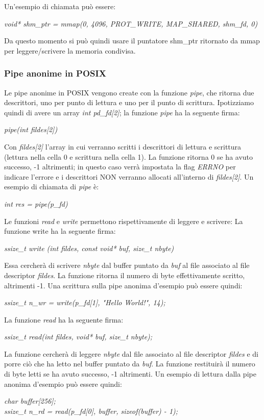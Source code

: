 \documentclass[12pt]{article}
\begin{document}
Un'esempio di chiamata può essere:
\begin{center}
    \textit{void* shm\_ptr = mmap(0, 4096, PROT\_WRITE, MAP\_SHARED, shm\_fd, 0)}
\end{center}
Da questo momento si può quindi usare il puntatore shm\_ptr ritornato da mmap per leggere/scrivere la memoria condivisa.
\subsubsection{Pipe anonime in POSIX}
Le pipe anonime in POSIX vengono create con la funzione \textit{pipe}, che ritorna due descrittori, uno per punto di lettura e uno per il punto di scrittura.
Ipotizziamo quindi di avere un array \textit{int pd\_fd[2]}; la funzione \textit{pipe} ha la seguente firma:
\begin{center}
    \textit{pipe(int fildes[2])}
\end{center}
Con \textit{fildes[2]} l'array in cui verranno scritti i descrittori di lettura e scrittura (lettura nella cella 0 e scrittura nella cella 1). La funzione ritorna 0 se ha avuto successo, -1 altrimenti; in questo caso
verrà impostata la flag \textit{ERRNO} per indicare l'errore e i descrittori NON verranno allocati all'interno di \textit{fildes[2]}. Un esempio di chiamata di \textit{pipe} è:
\begin{center}
    \textit{int res = pipe(p\_fd)}
\end{center}
Le funzioni \textit{read} e \textit{write} permettono rispettivamente di leggere e scrivere: \newline
La funzione write ha la seguente firma:
\begin{center}
    \textit{ssize\_t write (int fildes, const void* buf, size\_t nbyte)}
\end{center}
Essa cercherà di scrivere \textit{nbyte} dal buffer puntato da \textit{buf} al file associato al file descriptor \textit{fildes}.
La funzione ritorna il numero di byte effettivamente scritto, altrimenti -1.
Una scrittura sulla pipe anonima d'esempio può essere quindi:
\begin{center}
    \textit{ssize\_t n\_wr = write(p\_fd[1], "Hello World!", 14);}
\end{center}
La funzione \textit{read} ha la seguente firma:
\begin{center}
    \textit{ssize\_t read(int fildes, void* buf, size\_t nbyte);}
\end{center}
La funzione cercherà di leggere \textit{nbyte} dal file associato al file descriptor \textit{fildes} e di porre ciò che ha letto
nel buffer puntato da \textit{buf}. La funzione restituirà il numero di byte letti se ha avuto successo, -1 altrimenti.
Un esempio di lettura dalla pipe anonima d'esempio può essere quindi:
\begin{center}
    \textit{char buffer[256];} \\
    \textit{ssize\_t n\_rd = read(p\_fd[0], buffer, sizeof(buffer) - 1);}
\end{center}
\end{document}
